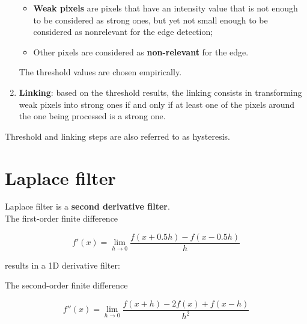 \documentclass{article}
\begin{document}
\begin{enumerate}[start=0]
\begin{itemize}
        \item \textbf{Weak pixels} are pixels that have an intensity value that is not enough to be considered as strong ones, but yet not small enough to be considered as nonrelevant for the edge detection;
        \item Other pixels are considered as \textbf{non-relevant} for the edge.
    \end{itemize}
    The threshold values are chosen empirically.
    \item \textbf{Linking}: based on the threshold results, the linking consists in transforming weak pixels into strong ones if and only if at least one of the pixels around the one being processed is a strong one.
\end{enumerate}

Threshold and linking steps are also referred to as hysteresis.

\newpage

\section*{Laplace filter}

Laplace filter is a \textbf{second derivative filter}. \\

The first-order finite difference

\begin{center}
    \begin{equation*}
        f'(x) = \lim_{h\to 0} \frac{f(x + 0.5h) - f(x - 0.5h)}{h}
    \end{equation*}
\end{center}

results in a 1D derivative filter:

\begin{center}
\end{center}

\vspace{0.5cm}

The second-order finite difference

\begin{center}
    \begin{equation*}
        f''(x) = \lim_{h\to 0} \frac{f(x + h) - 2f(x) + f(x - h)}{h^2}
    \end{equation*}
\end{center}
\end{document}
